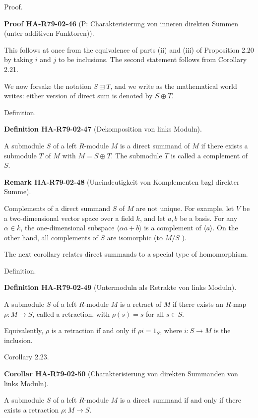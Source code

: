 \documentclass[10pt, letterpaper]{article}
\newcommand{\CustomHeading}[3]{%
  \par\medskip\noindent%
  \textbf{#1 #2} \textnormal{(#3)}.\enskip%
}
\newenvironment{DEF}[2]{\begin{unitbox}\CustomHeading{Definition}{#1}{#2}}{\end{unitbox}}
\newenvironment{KORO}[2]{\begin{unitbox}\CustomHeading{Corollar}{#1}{#2}}{\end{unitbox}}
\newenvironment{REM}[2]{\begin{unitbox}\CustomHeading{Remark}{#1}{#2}}{\end{unitbox}}
\newenvironment{PROOF}[2]{\begin{unitbox}\CustomHeading{Proof}{#1}{#2}}{\end{unitbox}}
\begin{document}
Proof. 

\begin{PROOF}{HA-R79-02-46}{P: Charakterisierung von inneren direkten Summen (unter additiven Funktoren)}
This follows at once from the equivalence of parts (ii) and (iii) of Proposition 2.20 by taking $i$ and $j$ to be inclusions. The second statement follows from Corollary 2.21.
\end{PROOF}

We now forsake the notation $S \boxplus T$, and we write as the mathematical world writes: either version of direct sum is denoted by $S \oplus T$.

Definition. 


\begin{DEF}{HA-R79-02-47}{Dekomposition von links Moduln}
A submodule $S$ of a left $R$-module $M$ is a direct summand of $M$ if there exists a submodule $T$ of $M$ with $M=S \oplus T$. The submodule $T$ is called a complement of $S$.
\end{DEF}

\begin{REM}{HA-R79-02-48}{Uneindeutigkeit von Komplementen bzgl direkter Summe}
Complements of a direct summand $S$ of $M$ are not unique. For example, let $V$ be a two-dimensional vector space over a field $k$, and let $a, b$ be a basis. For any $\alpha \in k$, the one-dimensional subspace $\langle\alpha a+b\rangle$ is a complement of $\langle a\rangle$. On the other hand, all complements of $S$ are isomorphic (to $M / S$ ).
\end{REM}

The next corollary relates direct summands to a special type of homomorphism.

Definition. 

\begin{DEF}{HA-R79-02-49}{Untermoduln als Retrakte von links Moduln}
A submodule $S$ of a left $R$-module $M$ is a retract of $M$ if there exists an $R$-map $\rho: M \rightarrow S$, called a retraction, with $\rho(s)=s$ for all $s \in S$.

Equivalently, $\rho$ is a retraction if and only if $\rho i=1_{S}$, where $i: S \rightarrow M$ is the inclusion.
\end{DEF}

Corollary 2.23. 

\begin{KORO}{HA-R79-02-50}{Charakterisierung von direkten Summanden von links Moduln}
A submodule $S$ of a left $R$-module $M$ is a direct summand if and only if there exists a retraction $\rho: M \rightarrow S$.
\end{KORO}
\end{document}

